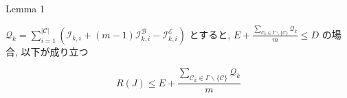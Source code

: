 



\begin{frame}[label=lemma2]{Lemma 1}
    \begin{lemma}[]
        $\mathcal{Q}_{k}=\sum_{i=1}^{|\mathcal{C}|}\left(\mathcal{I}_{k, i}+(m-1) \mathcal{I}_{k, i}^{\mathcal{B}}-\mathcal{I}_{k, i}^{\mathcal{E}}\right)$ とすると,
        $E+\frac{\sum_{\mathcal{C}_{k} \in \Gamma \backslash\{\mathcal{C}\}} \mathcal{Q}_{k}}{m} \leq D$ の場合, 以下が成り立つ

        \begin{equation*}
            R(J) \leq E+\frac{\sum_{\mathcal{C}_{k} \in \Gamma \backslash\{\mathcal{C}\}} \mathcal{Q}_{k}}{m}
        \end{equation*}
    \end{lemma}
\end{frame}

